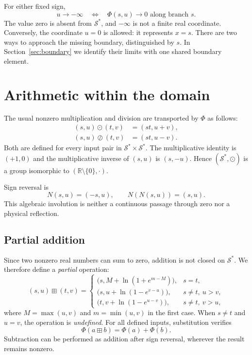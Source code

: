 \documentclass[11pt,a4paper]{article}
\newcommand{\Sstar}{\mathcal{S}^{\ast}}
\newcommand{\R}{\mathbb{R}}
\begin{document}
For either fixed sign,
\begin{equation}
 u\longrightarrow-\infty
 \quad\Longleftrightarrow\quad
 \Phi(s,u)\longrightarrow0\text{ along branch }s.
\end{equation}
The value zero is absent from $\Sstar$, and $-\infty$ is not a
finite real coordinate. Conversely, the coordinate $u=0$ is allowed:
it represents $x=s$. There are two ways to approach the missing
boundary, distinguished by $s$. In Section~\ref{sec:boundary}
we identify their limits with one shared boundary element.

\section{Arithmetic within the domain}

The usual nonzero multiplication and division are transported by
$\Phi$ as follows:
\begin{align}
 (s,u)\odot(t,v)&=(st,u+v),\\
 (s,u)\oslash(t,v)&=(st,u-v).
\end{align}
Both are defined for every input pair in $\Sstar\times\Sstar$.
The multiplicative identity is $(+1,0)$ and the multiplicative inverse
of $(s,u)$ is $(s,-u)$.
Hence $(\Sstar,\odot)$ is a group isomorphic to
$(\R\setminus\{0\},\cdot)$.

Sign reversal is
\begin{equation}
 N(s,u)=(-s,u),\qquad N(N(s,u))=(s,u).
\end{equation}
This algebraic involution is neither a continuous passage through
zero nor a physical reflection.

\subsection{Partial addition}

Since two nonzero real numbers can sum to zero, addition is not closed
on $\Sstar$. We therefore define a \emph{partial} operation:
\begin{equation}
(s,u)\boxplus(t,v)=
\begin{cases}
 \bigl(s,M+\ln(1+e^{m-M})\bigr),
  &s=t,\\[3pt]
 \bigl(s,u+\ln(1-e^{v-u})\bigr),
  &s\ne t,\ u>v,\\[3pt]
 \bigl(t,v+\ln(1-e^{u-v})\bigr),
  &s\ne t,\ v>u,
\end{cases}
\label{eq:add}
\end{equation}
where $M=\max(u,v)$ and $m=\min(u,v)$ in the first case.
When $s\ne t$ and $u=v$, the operation is \emph{undefined}.
For all defined inputs, substitution verifies
\begin{equation}
 \Phi(a\boxplus b)=\Phi(a)+\Phi(b).
\end{equation}
Subtraction can be performed as addition after sign reversal,
wherever the result remains nonzero.
\end{document}
